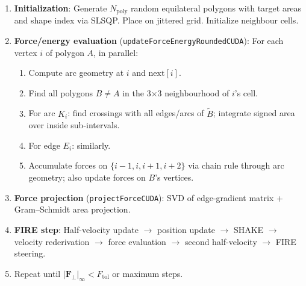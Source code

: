 \documentclass[12pt]{article}
\begin{document}
\begin{enumerate}
  \item \textbf{Initialization}:
    Generate $N_{\mathrm{poly}}$ random equilateral polygons with target areas and
    shape index via SLSQP.  Place on jittered grid.  Initialize neighbour cells.

  \item \textbf{Force/energy evaluation} (\texttt{updateForceEnergyRoundedCUDA}):
    For each vertex $i$ of polygon $A$, in parallel:
    \begin{enumerate}
      \item Compute arc geometry at $i$ and $\mathrm{next}[i]$.
      \item Find all polygons $B \neq A$ in the 3×3 neighbourhood of $i$'s cell.
      \item For arc $K_i$: find crossings with all edges/arcs of $\tilde B$;
            integrate signed area over inside sub-intervals.
      \item For edge $E_i$: similarly.
      \item Accumulate forces on $\{i\!-\!1, i, i\!+\!1, i\!+\!2\}$ via
            chain rule through arc geometry; also update forces on $B$'s vertices.
    \end{enumerate}

  \item \textbf{Force projection} (\texttt{projectForceCUDA}):
    SVD of edge-gradient matrix + Gram–Schmidt area projection.

  \item \textbf{FIRE step}:
    Half-velocity update $\to$ position update $\to$ SHAKE $\to$ velocity rederivation
    $\to$ force evaluation $\to$ second half-velocity $\to$ FIRE steering.

  \item Repeat until $|\mathbf{F}_\perp|_\infty < F_{\mathrm{tol}}$ or maximum steps.
\end{enumerate}
\end{document}
